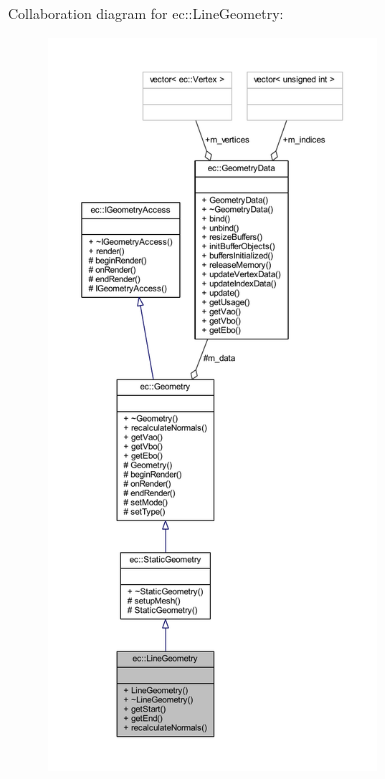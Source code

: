 Collaboration diagram for ec\+:\+:Line\+Geometry\+:\nopagebreak
\begin{figure}[H]
\begin{center}
\leavevmode
\includegraphics[height=550pt]{classec_1_1_line_geometry__coll__graph}
\end{center}
\end{figure}
